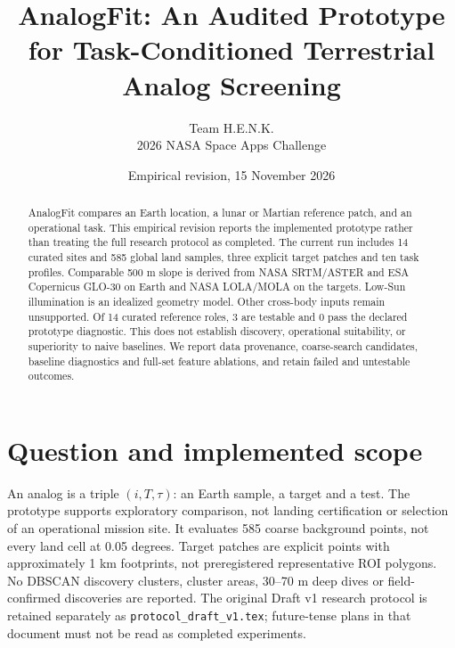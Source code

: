 \documentclass[10pt,a4paper]{article}
\title{AnalogFit: An Audited Prototype for Task-Conditioned Terrestrial Analog Screening}
\author{Team H.E.N.K.\\2026 NASA Space Apps Challenge}
\date{Empirical revision, 15 November 2026}
\begin{document}
\maketitle
\begin{abstract}
AnalogFit compares an Earth location, a lunar or Martian reference patch, and an operational task. This empirical revision reports the implemented prototype rather than treating the full research protocol as completed. The current run includes 14 curated sites and 585 global land samples, three explicit target patches and ten task profiles. Comparable 500 m slope is derived from NASA SRTM/ASTER and ESA Copernicus GLO-30 on Earth and NASA LOLA/MOLA on the targets. Low-Sun illumination is an idealized geometry model. Other cross-body inputs remain unsupported. Of 14 curated reference roles, 3 are testable and 0 pass the declared prototype diagnostic. This does not establish discovery, operational suitability, or superiority to naive baselines. We report data provenance, coarse-search candidates, baseline diagnostics and full-set feature ablations, and retain failed and untestable outcomes.
\end{abstract}
\section{Question and implemented scope}
An analog is a triple $(i,T,\tau)$: an Earth sample, a target and a test.
The prototype supports exploratory comparison, not landing certification or
selection of an operational mission site. It evaluates 585 coarse background
points, not every land cell at 0.05 degrees. Target patches are explicit points
with approximately 1 km footprints, not preregistered representative ROI polygons.
No DBSCAN discovery clusters, cluster areas, 30--70 m deep dives or field-confirmed
discoveries are reported. The original Draft v1 research protocol is retained
separately as \texttt{protocol\_draft\_v1.tex}; future-tense plans in that document
must not be read as completed experiments.
\end{document}
